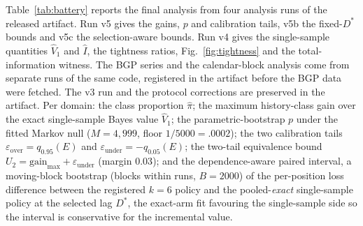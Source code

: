 \documentclass[acmsmall,screen,review,anonymous]{acmart}
\begin{document}
Table~\ref{tab:battery} reports the final analysis
from four analysis runs of the released artifact. Run v5 gives the gains,
$p$ and calibration tails, v5b the fixed-$D^*$ bounds and v5c the
selection-aware bounds. Run v4 gives the single-sample quantities
$\widehat V_1$ and $\widehat I$, the tightness ratios,
Fig.~\ref{fig:tightness} and the total-information witness. The BGP series and the calendar-block
analysis come from separate runs of the same code, registered in the
artifact before the BGP data were fetched. The v3 run and the
protocol corrections are preserved in the artifact. Per domain: the class proportion $\hat\pi$; the
maximum history-class gain over the exact single-sample Bayes value
$\widehat V_1$; the parametric-bootstrap $p$ under the fitted Markov null
($M{=}4{,}999$, floor $1/5000=.0002$); the two calibration tails
$\varepsilon_{\mathrm{over}}=q_{0.95}(E)$ and
$\varepsilon_{\mathrm{under}}=-q_{0.05}(E)$; the two-tail equivalence
bound $U_2=\text{gain}_{\max}+\varepsilon_{\mathrm{under}}$
(margin $0.03$); and the dependence-aware paired interval, a
moving-block bootstrap (blocks within runs, $B{=}2000$) of the per-position
loss difference between the registered $k{=}6$ policy and the
pooled-\emph{exact} single-sample policy at the selected lag $D^*$, the
exact-arm fit favouring the single-sample side so the interval is
conservative for the incremental value.
\end{document}
